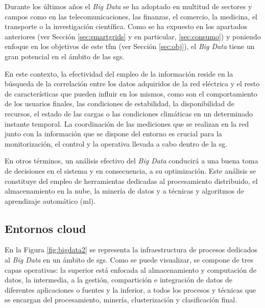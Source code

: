 \vspace{1mm}

Durante los últimos años el \textit{Big Data} se ha adoptado en multitud de sectores y campos como en las telecomunicaciones, las finanzas, el comercio, la medicina, el transporte o la investigación científica. Como se ha expuesto en los apartados anteriores (ver Sección \ref{sec:smartgrids} y en particular, \ref{sec:consumo}) y poniendo enfoque en los objetivos de este \gls{tfm} (ver Sección \ref{sec:obj}), el \textit{Big Data} tiene un gran potencial en el ámbito de las \gls{sg}s.

\vspace{3mm}

En este contexto, la efectividad del empleo de la información reside en la búsqueda de la correlación entre los datos adquiridos de la red eléctrica y el resto de características que pueden influir en los mismos, como son el comportamiento de los usuarios finales, las condiciones de estabilidad, la disponibilidad de recursos, el estado de las cargas o las condiciones climáticas en un determinado instante temporal. La coordinación de las mediciones que se realizan en la red junto con la información que se dispone del entorno es crucial para la monitorización, el control y la operativa llevada a cabo dentro de la \gls{sg}.~\cite{stab} 

\vspace{3mm}

En otros términos, un análisis efectivo del \textit{Big Data} conducirá a una buena toma de decisiones en el sistema y en consecuencia, a su optimización. Este análisis se constituye del empleo de herramientas dedicadas al procesamiento distribuido, el almacenamiento en la nube, la minería de datos y a técnicas y algoritmos de aprendizaje automático (\gls{ml}). 

\vspace{3mm}

\subsection{Entornos cloud}

En la Figura \ref{fig:bigdata2} se representa la infraestructura de procesos dedicados al \textit{Big Data} en un ámbito de \gls{sg}s. Como se puede visualizar, se compone de tres capas operativas: la superior está enfocada al almacenamiento y computación de datos, la intermedia, a la gestión, compartición e integración de datos de diferentes aplicaciones o fuentes y la inferior, a todos los procesos y técnicas que se encargan del procesamiento, minería, clusterización y clasificación final. \cite{stab} 

